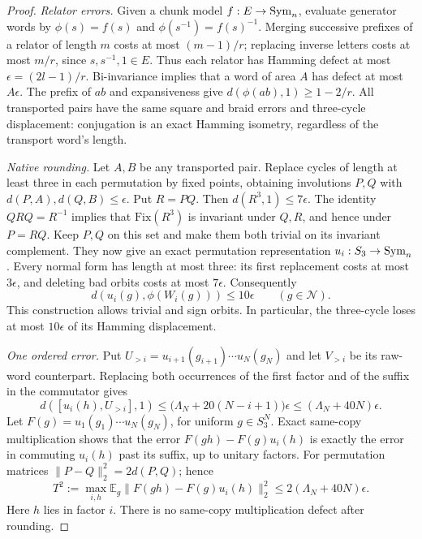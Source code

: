 \begin{proof}
\emph{Relator errors.} Given a chunk model $f:E\to\operatorname{Sym}_n$, evaluate generator words by $\phi(s)=f(s)$ and
$\phi(s^{-1})=f(s)^{-1}$. Merging successive prefixes of a relator of length $m$ costs at most $(m-1)/r$;
replacing inverse letters costs at most $m/r$, since $s,s^{-1},1\in E$. Thus each relator has Hamming defect at most
$\epsilon=(2l-1)/r$. Bi-invariance implies that a word of area $A$ has defect at most $A\epsilon$.
The prefix of $ab$ and expansiveness give $d(\phi(ab),1)\ge1-2/r$. All transported pairs have the same square and braid
errors and three-cycle displacement: conjugation is an exact Hamming isometry, regardless of the transport word's length.

\emph{Native rounding.} Let $A,B$ be any transported pair. Replace cycles of length at least three in each permutation by fixed points,
obtaining involutions $P,Q$ with $d(P,A),d(Q,B)\le\epsilon$. Put $R=PQ$. Then
$d(R^3,1)\le7\epsilon$. The identity $QRQ=R^{-1}$ implies that $\mathrm{Fix}(R^3)$ is invariant under $Q,R$, and hence under $P=RQ$.
Keep $P,Q$ on this set and make them both trivial on its invariant complement. They now give an exact permutation representation
$u_i:S_3\to\operatorname{Sym}_n$. Every normal form has length at most three: its first replacement costs at most $3\epsilon$, and deleting bad
orbits costs at most $7\epsilon$. Consequently
\[
 d(u_i(g),\phi(W_i(g)))\le10\epsilon\qquad(g\in\mathcal N).
\]
This construction allows trivial and sign orbits. In particular, the three-cycle loses at most $10\epsilon$ of its Hamming displacement.

\emph{One ordered error.} Put $U_{>i}=u_{i+1}(g_{i+1})\cdots u_N(g_N)$ and let $V_{>i}$ be its raw-word counterpart.
Replacing both occurrences of the first factor and of the suffix in the commutator gives
\[
 d([u_i(h),U_{>i}],1)
 \le\bigl(\Lambda_N+20(N-i+1)\bigr)\epsilon
 \le(\Lambda_N+40N)\epsilon.
\]
Let $F(g)=u_1(g_1)\cdots u_N(g_N)$, for uniform $g\in S_3^N$. Exact same-copy multiplication shows that the error
$F(gh)-F(g)u_i(h)$ is exactly the error in commuting $u_i(h)$ past its suffix, up to unitary factors.
For permutation matrices $\|P-Q\|_2^2=2d(P,Q)$; hence
\[
 T^2:=\max_{i,h}\mathbb E_g\|F(gh)-F(g)u_i(h)\|_2^2
 \le2(\Lambda_N+40N)\epsilon.
\]
Here $h$ lies in factor $i$. There is no same-copy multiplication defect after rounding.


\end{proof}
